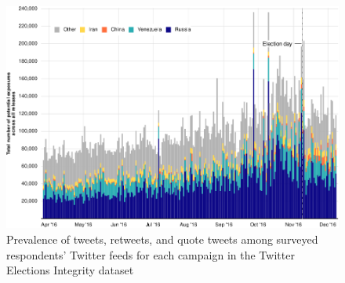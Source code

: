 \documentclass[
  12pt,
]{article}
\begin{document}
\begin{figure}[h]

{\centering \includegraphics[width=1\linewidth,height=0.65\textheight]{Supplementary_Information_files/figure-latex/Supplementary-Figure-A2-1} 

}

\caption{Prevalence of tweets, retweets, and quote tweets among surveyed respondents' Twitter feeds for each campaign in the Twitter Elections Integrity dataset}\label{fig:Supplementary-Figure-A2}
\end{figure}
\end{document}
